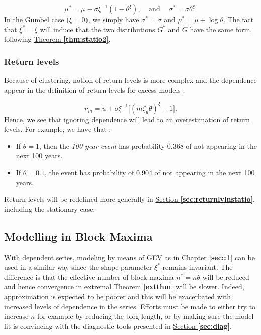 \begin{equation}
\mu^* = \mu-\sigma\xi^{-1}(1-\theta^{\xi}), \ \ \ \   \ \text{and} \ \quad \sigma^*=\sigma\theta^{\xi}.
\end{equation}
In the Gumbel case ($\xi=0$), we simply have $\sigma^*=\sigma$ and $\mu^*=\mu+\log\theta$.
The fact that $\xi^*=\xi$ will induce that the two distributions $G^*$ and $G$ have the same form, following \hyperref[thm:statio2]{Theorem \textbf{\ref{thm:statio2}}}.




\subsubsection*{Return levels}

Because of clustering, notion of return levels is more complex and the dependence appear in the definition of return levels for excess models :

\begin{equation}\label{eq:rlstatio}
r_m = u + \sigma\xi^{-1}\Big[(m\zeta_u\theta)^{\xi}-1\Big].
\end{equation}
Hence, we see that ignoring dependence will lead to an overestimation of return levels. For example, we have that :

\begin{itemize}
	\item If $\theta=1$, then the \textit{100-year-event} has probability 0.368 of not appearing in the next 100 years.
	\item If $\theta=0.1$, the event has probability of 0.904 of not appearing in the next 100 years.
\end{itemize}
Return levels will be redefined more generally in \hyperref[sec:returnlvlnstatio]{Section \textbf{\ref{sec:returnlvlnstatio}}}, including the stationary case.

\subsection{Modelling in Block Maxima}

With dependent series, modeling by means of GEV as in 
\hyperref[sec::1]{Chapter \textbf{\ref{sec::1}}} can be used in 
a similar way since the shape parameter $\xi^*$ remains invariant. The difference is that the effective number of block maxima $n^*=n\theta$ will be reduced and hence convergence in \hyperref[extthm]{extremal Theorem \textbf{\ref{extthm}}} will be slower. 
Indeed, approximation is expected to be poorer and this will be exacerbated with increased levels of dependence in the series.
Efforts must be made to either try to increase $n$ for example by reducing the blog length, or by making sure the model fit is convincing with the diagnostic tools presented in \hyperref[sec:diag]{Section \textbf{\ref{sec:diag}}}.


